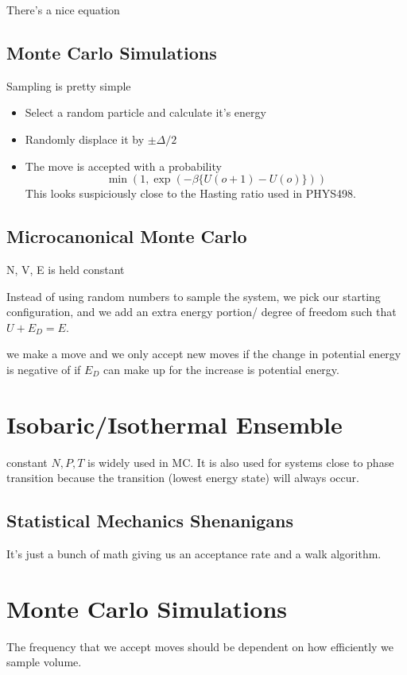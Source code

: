 \documentclass[fleqn]{report}
\begin{document}
There's a nice equation 

\subsection{Monte Carlo Simulations}
Sampling is pretty simple 

\begin{itemize} 
    \item 
    Select a random particle and calculate it's energy 
    \item 
    Randomly displace it by $\pm \Delta/2$
    \item 
    The move is accepted with a probability 
    \[
    \min(1, \exp(-\beta\{ U(o+1) - U(o)\}))
    \]
    This looks suspiciously close to the Hasting ratio 
    used in PHYS498. 
\end{itemize}

\subsection{Microcanonical Monte Carlo}
N, V, E is held constant 

Instead of using random numbers to sample the system, we 
pick our starting configuration, and we add an extra energy portion/
degree of freedom such that $U + E_D = E$.

we make a move and we only accept new moves if 
the change in potential energy is negative of if $E_D$ can make up 
for the increase is potential energy.

\section{Isobaric/Isothermal Ensemble}
constant $N, P, T$ is widely used in MC. It is also used for systems 
close to phase transition because the transition (lowest energy state)
will always occur. 

\subsection{Statistical Mechanics Shenanigans}
It's just a bunch of math giving us an acceptance rate and a walk 
algorithm. 

\section{Monte Carlo Simulations}
The frequency that we accept moves should be dependent on how efficiently 
we sample volume. 
\end{document}
